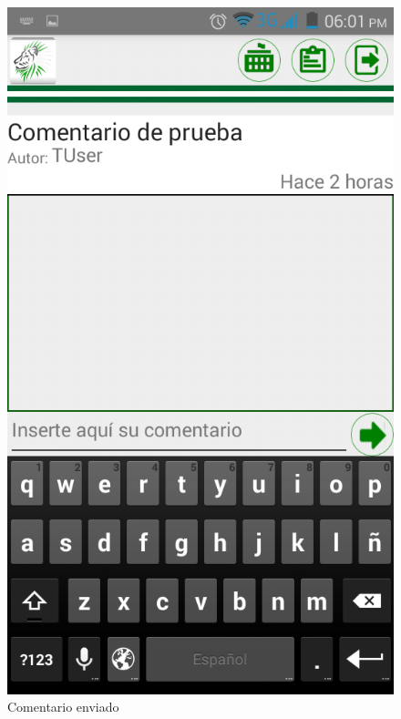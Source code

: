 \begin{figure}
\centering
\includegraphics[scale=0.5]{./android/imagenes/com3.png}
\caption{Comentario enviado}
\label{com3}
\end{figure}
%

